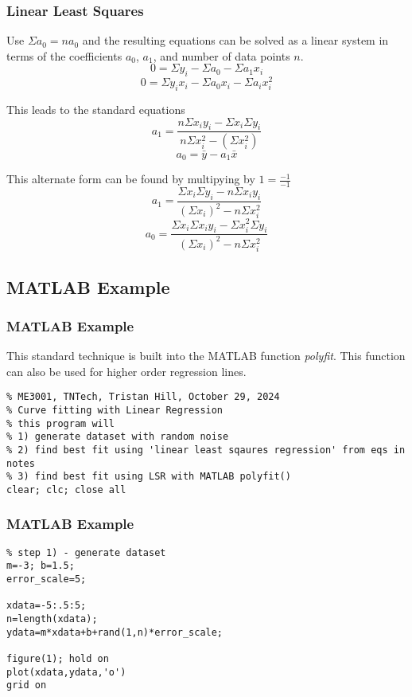 \documentclass[fleqn]{beamer} %
\newcommand{\sectionIIsubsectionIIItitle}{Linear Least Squares}
\newcommand{\sectionIIsubsectionIVtitle}{MATLAB Example}
\begin{document}
			\begin{frame}
				\frametitle{\sectionIIsubsectionIIItitle}
				\bigskip
	
				Use $\Sigma a_0=na_0$ and the resulting equations can be solved as a linear system in terms of the coefficients $a_0$, $a_1$, and number of data points $n$. 
				\[ 0 = \Sigma y_i - \Sigma a_0 - \Sigma a_1x_i \]
				\[ 0 = \Sigma y_ix_i - \Sigma a_0x_i - \Sigma a_ix_i^2\]



				This leads to the standard equations 
				\[a_1= \frac{n\Sigma x_iy_i-\Sigma x_i \Sigma y_i}{n\Sigma x_i^2-\left(\Sigma x_i^2\right)} \]
				\[a_0= \bar{y} -a_1\bar{x}\]
				
				This alternate form can be found by multipying by $1=\frac{-1}{-1}$
				\[a_1=\frac{\Sigma x_i\Sigma y_i-n\Sigma x_i y_i }{(\Sigma x_i)^2-n\Sigma x_i^2}\]
				\[a_0=\frac{\Sigma x_i\Sigma x_i y_i-\Sigma x_i^2\Sigma y_i}{(\Sigma x_i)^2-n\Sigma x_i^2}\] 

				\btVFill 
			\end{frame}


		\subsection{\sectionIIsubsectionIVtitle}\label{sectionIIsubsectionIV}

			\begin{frame}[fragile]
				\frametitle{\sectionIIsubsectionIVtitle}
				\bigskip
				This standard technique is built into the MATLAB function {\it polyfit}. This function can also be used for higher order regression lines.
				\begin{lstlisting}
% ME3001, TNTech, Tristan Hill, October 29, 2024
% Curve fitting with Linear Regression 
% this program will
% 1) generate dataset with random noise
% 2) find best fit using 'linear least sqaures regression' from eqs in notes
% 3) find best fit using LSR with MATLAB polyfit()
clear; clc; close all  
        \end{lstlisting}
          
				\btVFill 
			\end{frame}

			\begin{frame}[fragile]
				\frametitle{\sectionIIsubsectionIVtitle}
				\bigskip

        \begin{lstlisting}
% step 1) - generate dataset
m=-3; b=1.5;
error_scale=5;

xdata=-5:.5:5;
n=length(xdata);
ydata=m*xdata+b+rand(1,n)*error_scale;

figure(1); hold on
plot(xdata,ydata,'o')
grid on 
        \end{lstlisting}

				\btVFill 
			\end{frame}
		
\end{document}
